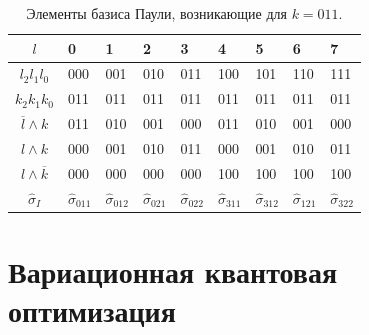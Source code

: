 \documentclass[a4paper]{report}
\begin{document}
\begin{table}[h!]
    \centering
    \begin{tabular}{ | c | P{1cm} | P{1cm} | P{1cm} | P{1cm} | P{1cm} | P{1cm} | P{1cm} | P{1cm} | }
        \hline
        ${l}$                    & 0                      & 1                      & 2                      & 3                      & 4                      & 5                      & 6                      & 7                      \\
        \hline
        ${l_2 l_1 l_0}$          & 000                    & 001                    & 010                    & 011                    & 100                    & 101                    & 110                    & 111                    \\
        \hline
        ${k_2 k_1 k_0}$          & 011                    & 011                    & 011                    & 011                    & 011                    & 011                    & 011                    & 011                    \\
        \hline
        ${\overline{l}\wedge k}$ & 011                    & 010                    & 001                    & 000                    & 011                    & 010                    & 001                    & 000                    \\
        \hline
        ${l\wedge k}$            & 000                    & 001                    & 010                    & 011                    & 000                    & 001                    & 010                    & 011                    \\
        \hline
        ${l\wedge \overline{k}}$ & 000                    & 000                    & 000                    & 000                    & 100                    & 100                    & 100                    & 100                    \\
        \hline
        ${\hat{\sigma}_{I}}$     & ${\hat{\sigma}_{011}}$ & ${\hat{\sigma}_{012}}$ & ${\hat{\sigma}_{021}}$ & ${\hat{\sigma}_{022}}$ & ${\hat{\sigma}_{311}}$ & ${\hat{\sigma}_{312}}$ & ${\hat{\sigma}_{121}}$ & ${\hat{\sigma}_{322}}$ \\
        \hline
    \end{tabular}
    \caption{Элементы базиса Паули, возникающие для ${k=011}$.}\label{table2}
\end{table}

\section{Вариационная квантовая оптимизация}
\end{document}
